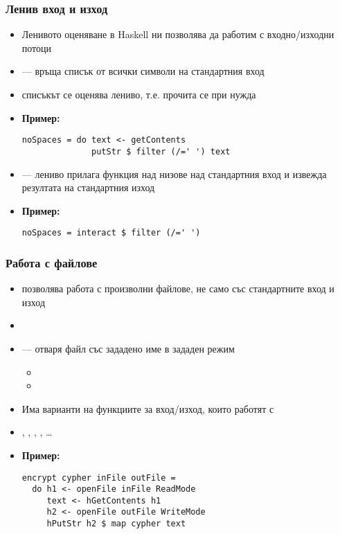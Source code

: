 \documentclass[alsotrans]{beamerswitch}
\begin{document}
\begin{frame}[fragile]
  \frametitle{Ленив вход и изход}

  \begin{itemize}[<+->]
  \item Ленивото оценяване в Haskell ни позволява да работим с входно/изходни потоци
  \item {} --- връща списък от \alert{всички} символи на стандартния вход
  \item списъкът се оценява лениво, т.е. прочита се при нужда
  \item \textbf{Пример:}
\begin{lstlisting}
noSpaces = do text <- getContents
              putStr $ filter (/=' ') text
\end{lstlisting}
  \item {} --- лениво прилага функция над низове над стандартния вход и извежда резултата на стандартния изход
  \item \textbf{Пример:}
\begin{lstlisting}
noSpaces = interact $ filter (/=' ')
\end{lstlisting}
  \end{itemize}
\end{frame}

\begin{frame}[fragile]
  \frametitle{Работа с файлове}

  \begin{itemize}[<+->]
  \item {} позволява работа с произволни файлове, не само със стандартните вход и изход
  \item {}
  \item {} --- отваря файл със зададено име в зададен режим
    \begin{itemize}
      \footnotesize
    \item {}
    \item {}
    \end{itemize}
  \item Има варианти на функциите за вход/изход, които работят с 
  \item {}, , , , \ldots
  \item \textbf{Пример:}
    \vspace{-1ex}
\begin{lstlisting}
encrypt cypher inFile outFile =
  do h1 <- openFile inFile ReadMode
     text <- hGetContents h1
     h2 <- openFile outFile WriteMode
     hPutStr h2 $ map cypher text
\end{lstlisting}
  \end{itemize}
\end{frame}
\end{document}
